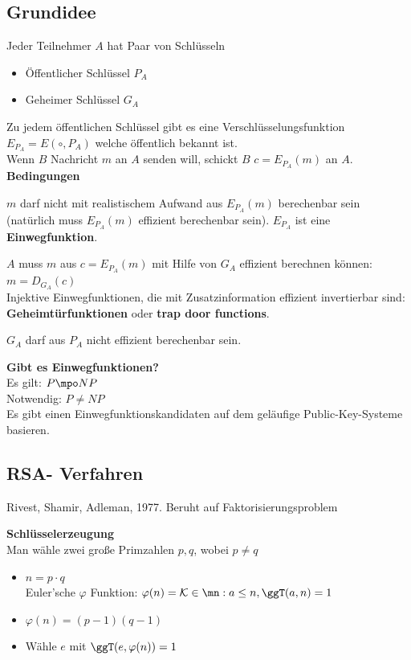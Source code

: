 	\subsection{Grundidee}
		Jeder Teilnehmer $A$ hat Paar von Schlüsseln
		\begin{itemize}
			\item Öffentlicher Schlüssel $P_A$
			\item Geheimer Schlüssel $G_A$
		\end{itemize}
		Zu jedem öffentlichen Schlüssel gibt es eine Verschlüsselungsfunktion	 $E_{P_A}=E(\circ, P_A)$ welche öffentlich bekannt ist.\\
		Wenn $B$ Nachricht $m$ an $A$ senden will, schickt $B$ $c=E_{P_A}(m)$ an $A$.
\newpage
		\textbf{Bedingungen}
			\item $m$ darf nicht mit realistischem Aufwand aus $E_{P_A}(m)$ berechenbar sein (natürlich muss $E_{P_A}(m)$ effizient berechenbar sein). $E_{P_A}$ ist eine \textbf{Einwegfunktion}.
			\item $A$ muss $m$ aus $c=E_{P_A}(m)$ mit Hilfe von $G_A$ effizient berechnen können: $m=D_{G_A}(c)$\\
			Injektive Einwegfunktionen, die mit Zusatzinformation effizient invertierbar sind: \textbf{Geheimtürfunktionen} oder \textbf{trap door functions}.
			\item $G_A$ darf aus $P_A$ nicht effizient berechenbar sein.
		\subExEnd
		
		\textbf{Gibt es Einwegfunktionen?}\\
		Es gilt: $P\mpo NP$\\
		Notwendig: $P\neq NP$\\
		Es gibt einen Einwegfunktionskandidaten auf dem geläufige Public-Key-Systeme basieren.
	
	\subsection{RSA- Verfahren}
		Rivest, Shamir, Adleman, 1977. Beruht auf Faktorisierungsproblem
			\item \textbf{Schlüsselerzeugung}\\
				Man wähle zwei große Primzahlen $p,q$, wobei $p\neq q$
				
				\begin{itemize}
					\item $n=p\cdot q$\\
						Euler'sche $\varphi$ Funktion: $\varphi(n)=\mathcal{K}\in\mn:a\leq n, \ggT(a,n)=1$
					\item $\varphi(n)=(p-1)(q-1)$
					\item Wähle $e$ mit $\ggT(e,\varphi(n))=1$
				\end{itemize}
				
